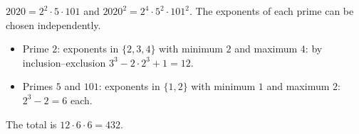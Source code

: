 $2020=2^2\cdot5\cdot101$ and $2020^2=2^4\cdot5^2\cdot101^2$. The exponents of each prime can be chosen independently.
\begin{itemize}
\item Prime $2$: exponents in $\{2,3,4\}$ with minimum $2$ and maximum $4$: by inclusion--exclusion $3^3-2\cdot2^3+1=12$.
\item Primes $5$ and $101$: exponents in $\{1,2\}$ with minimum $1$ and maximum $2$: $2^3-2=6$ each.
\end{itemize}
The total is $12\cdot6\cdot6=\boxed{432}$.
